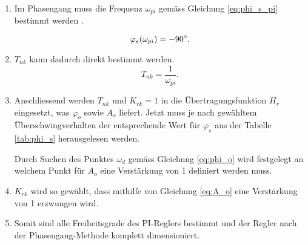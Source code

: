 \begin{enumerate}
    \item
        Im  Phasengang  muss  die Frequenz  $\omega_{pi}$  gem\"ass  Gleichung
        \ref{eq:phi_s_pi} bestimmt werden \footnotemark[1].

        \begin{equation} \label{eq:phi_s_pi}
            \varphi_s(\omega_{pi})=-90 \degree.
        \end{equation}

    \item
        $T_{nk}$ kann dadurch direkt bestimmt werden.
        \begin{equation} \label{eq:Tnk_pi}
            T_{nk}=\frac{1}{\omega_{pi}}.
        \end{equation}

    \item
        Anschliessend    werden    $T_{nk}$     und    $K_{rk}=1$    in    die
        \"Ubertragungsfunktion $H_r$  eingesetzt, was $\varphi_o$  sowie $A_o$
        liefert. Jetzt  muss  je  nach gew\"ahltem  \"Uberschwingverhalten  der
        entsprechende Wert  f\"ur $\varphi_s$ aus der  Tabelle \ref{tab:phi_s}
        herausgelesen werden.

        Durch Suchen des Punktes  $\omega_d$ gem\"ass Gleichung \ref{eq:phi_o}
        wird festgelegt an  welchem Punkt f\"ur $A_o$ eine  Verst\"arkung von 1
        definiert werden muss.

    \item
        $K_{rk}$ wird  so gew\"ahlt, dass mithilfe  von Gleichung \ref{eq:A_o}
        eine Verst\"arkung von 1 erzwungen wird.

    \item
        Somit sind alle Freiheitsgrade des  PI-Reglers bestimmt und der Regler
        nach der Phasengang-Methode komplett dimensioniert.
\end{enumerate}
